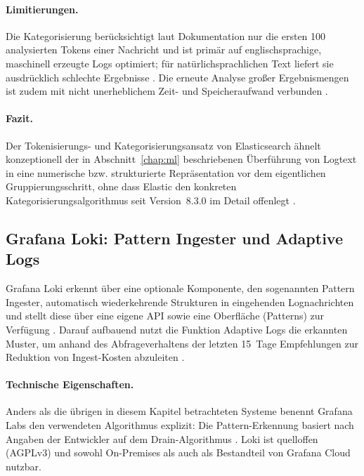 \paragraph{Limitierungen.}
Die Kategorisierung berücksichtigt laut Dokumentation nur die ersten 100 analysierten Tokens einer Nachricht und ist primär auf englischsprachige, maschinell erzeugte Logs optimiert; für natürlichsprachlichen Text liefert sie ausdrücklich schlechte Ergebnisse \cite{elasticMlConfiguringCategories}. Die erneute Analyse großer Ergebnismengen ist zudem mit nicht unerheblichem Zeit- und Speicheraufwand verbunden \cite{elasticCategorizeTextAgg}.

\paragraph{Fazit.}
Der Tokenisierungs- und Kategorisierungsansatz von Elasticsearch ähnelt konzeptionell der in Abschnitt~\ref{chap:ml} beschriebenen Überführung von Logtext in eine numerische bzw. strukturierte Repräsentation vor dem eigentlichen Gruppierungsschritt, ohne dass Elastic den konkreten Kategorisierungsalgorithmus seit Version~8.3.0 im Detail offenlegt \cite{elasticCategorizeTextAgg}.

\subsection{Grafana Loki: Pattern Ingester und Adaptive Logs}
\label{sec:loki_pattern}

Grafana Loki erkennt über eine optionale Komponente, den sogenannten Pattern Ingester, automatisch wiederkehrende Strukturen in eingehenden Lognachrichten und stellt diese über eine eigene \ac{API} sowie eine Oberfläche (\glqq Patterns\grqq) zur Verfügung \cite{grafanaLogPatternsDoc}. Darauf aufbauend nutzt die Funktion \glqq Adaptive Logs\grqq{} die erkannten Muster, um anhand des Abfrageverhaltens der letzten 15~Tage Empfehlungen zur Reduktion von Ingest-Kosten abzuleiten \cite{grafanaAdaptiveLogsHowItWorks}.

\paragraph{Technische Eigenschaften.}
Anders als die übrigen in diesem Kapitel betrachteten Systeme benennt Grafana Labs den verwendeten Algorithmus explizit: Die Pattern-Erkennung basiert nach Angaben der Entwickler auf dem Drain-Algorithmus \cite{grafanaLokiPatternIssue}. Loki ist quelloffen (AGPLv3) und sowohl On-Premises als auch als Bestandteil von Grafana Cloud nutzbar.

